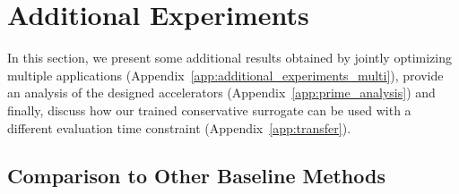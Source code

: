 \section{Additional Experiments}
In this section, we present some additional results obtained by jointly optimizing multiple applications (Appendix~\ref{app:additional_experiments_multi}), provide an analysis of the designed accelerators (Appendix~\ref{app:prime_analysis}) and finally, discuss how our trained conservative surrogate can be used with a different evaluation time constraint (Appendix~\ref{app:transfer}).

\subsection{Comparison to Other Baseline Methods}
\label{app:prime_additional_experiments}


